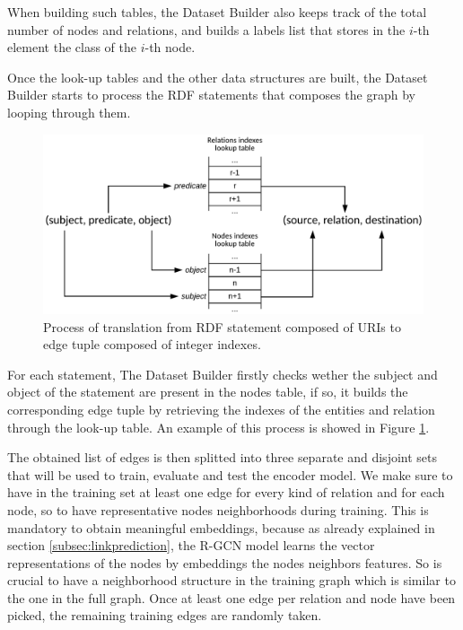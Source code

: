 \documentclass[%
    corpo=13.5pt,
    twoside,
    oldstyle,
    tipotesi=magistrale,
    greek,
    evenboxes
]{toptesi}
\begin{document}
When building such tables, the Dataset Builder also keeps track of the total
number of nodes and relations, and builds a labels list that stores in the
$i$-th element the class of the $i$-th node.

Once the look-up tables and the other data structures are built, the Dataset
Builder starts to process the RDF statements that composes the graph by
looping through them.

\begin{figure}[h]
    \centering
    \includegraphics[scale=1.0]{img/rdftodata.png}
    \caption{
        Process of translation from RDF statement composed of URIs to edge
        tuple composed of integer indexes.
    }
    \label{fig:rdftodata}
\end{figure}

For each statement, The Dataset Builder firstly checks wether the subject and
object of the statement are present in the nodes table, if so, it builds the
corresponding edge tuple by retrieving the indexes of the entities and relation
through the look-up table.
An example of this process is showed in Figure \ref{fig:rdftodata}.

The obtained list of edges is then splitted into three separate and disjoint
sets that will be used to train, evaluate and test the encoder model.
We make sure to have in the training set at least one edge for every kind of
relation and for each node, so to have representative nodes neighborhoods
during training.
This is mandatory to obtain meaningful embeddings, because
as already explained in section \ref{subsec:linkprediction}, the R-GCN model
learns the vector representations of the nodes by embeddings the nodes neighbors
features. So is crucial to have a neighborhood structure in the
training graph which is similar to the one in the full graph.
Once at least one edge per relation and node have been picked, the remaining
training edges are randomly taken.
\end{document}
